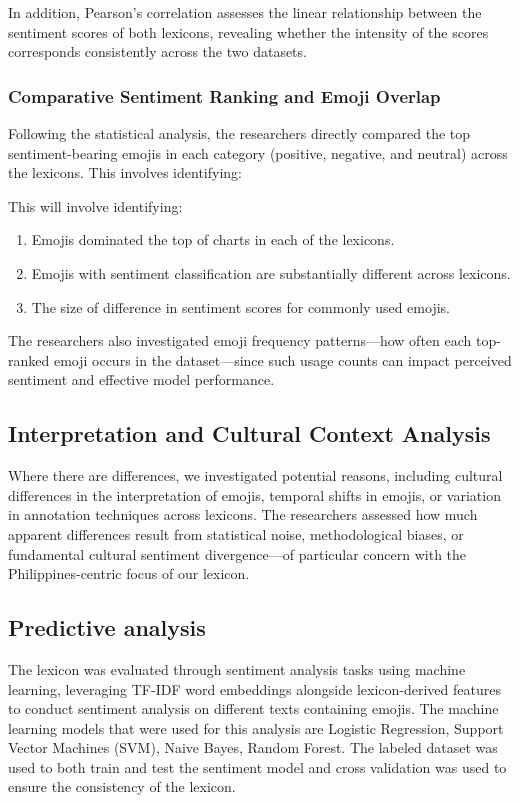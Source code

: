 In addition, Pearson's correlation assesses the linear relationship between the sentiment scores of both lexicons, revealing whether the intensity of the scores corresponds consistently across the two datasets.

\subsubsection{Comparative Sentiment Ranking and Emoji Overlap}

Following the statistical analysis, the researchers directly compared the top sentiment-bearing emojis in each category (positive, negative, and neutral) across the lexicons. This involves identifying:
 
This will involve identifying:

\begin{enumerate}
	\item Emojis dominated the top of charts in each of the lexicons.
	\item Emojis with sentiment classification are substantially different across lexicons.
	\item The size of difference in sentiment scores for commonly used emojis.
\end{enumerate}

The researchers also investigated emoji frequency patterns—how often each top-ranked emoji occurs in the dataset—since such usage counts can impact perceived sentiment and effective model performance.

\subsection{Interpretation and Cultural Context Analysis}

Where there are differences, we investigated potential reasons, including cultural differences in the interpretation of emojis, temporal shifts in emojis, or variation in annotation techniques across lexicons. The researchers assessed how much apparent differences result from statistical noise, methodological biases, or fundamental cultural sentiment divergence—of particular concern with the Philippines-centric focus of our lexicon.

\subsection{Predictive analysis}

The lexicon was evaluated through sentiment analysis tasks using machine learning, leveraging TF-IDF word embeddings alongside lexicon-derived features to conduct sentiment analysis on different texts containing emojis. The machine learning models that were used for this analysis are Logistic Regression, Support Vector Machines (SVM), Naive Bayes, Random Forest. The labeled dataset was used to both train and test the sentiment model and cross validation was used to ensure the consistency of the lexicon.

